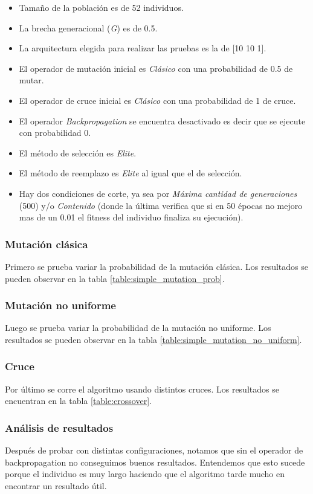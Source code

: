\documentclass{sig-alternate}
\begin{document}
	\begin{itemize}
		\item Tamaño de la población es de 52 individuos.
		\item La brecha generacional (\textit{G}) es de 0.5.
		\item La arquitectura elegida para realizar las pruebas es la de [10 10 1].
		\item El operador de mutación inicial es \textit{Clásico} con una probabilidad de 0.5 de mutar.
		\item El operador de cruce inicial es \textit{Clásico} con una probabilidad de 1 de cruce.
		\item El operador \textit{Backpropagation} se encuentra desactivado es decir que se ejecute con probabilidad 0.
		\item El método de selección es \textit{Elite}.
		\item El método de reemplazo es \textit{Elite} al igual que el de selección.
		\item Hay dos condiciones de corte, ya sea por \textit{Máxima cantidad de generaciones} (500) y/o \textit{Contenido} (donde la última verifica que si en 50 épocas no mejoro mas de un 0.01 el fitness del individuo finaliza su ejecución).
	\end{itemize}

	\subsubsection{Mutación clásica}
	Primero se prueba variar la probabilidad de la mutación clásica.
	Los resultados se pueden observar en la tabla \ref{table:simple_mutation_prob}.

	\subsubsection{Mutación no uniforme}
	Luego se prueba variar la probabilidad de la mutación no uniforme.
	Los resultados se pueden observar en la tabla \ref{table:simple_mutation_no_uniform}.

	\subsubsection{Cruce}
	Por último se corre el algoritmo usando distintos cruces.
	Los resultados se encuentran en la tabla \ref{table:crossover}.

	\subsubsection{Análisis de resultados}
	Después de probar con distintas configuraciones, notamos que sin el
	operador de backpropagation no conseguimos buenos	resultados.
	Entendemos que esto sucede porque el individuo es muy largo haciendo
	que el algoritmo tarde mucho en encontrar un resultado útil.
\end{document}
